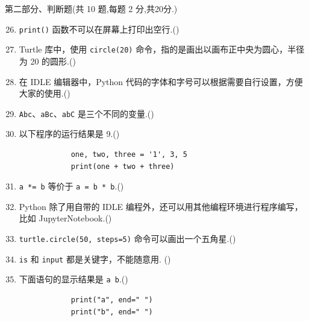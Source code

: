 \documentclass[11pt]{ctexart}
\begin{document}
    {\noindent\heiti 第二部分、判断题(共 10 题,每题 2 分,共20分.)}
    \begin{enumerate}
        \setcounter{enumi}{25}
        \item \lstinline{print()} 函数不可以在屏幕上打印出空行.(\qquad)

        \item Turtle 库中，使用 \lstinline{circle(20)} 命令，指的是画出以画布正中央为圆心，半径为 20 的圆形.(\qquad)
        
        \item 在 IDLE 编辑器中，Python 代码的字体和字号可以根据需要自行设置，方便大家的使用.(\qquad)
  
        \item \lstinline{Abc}、\lstinline{aBc}、\lstinline{abC} 是三个不同的变量.(\qquad)
        
        \item 以下程序的运行结果是 9.(\qquad)
        \begin{lstlisting}
            one, two, three = '1', 3, 5
            print(one + two + three)
        \end{lstlisting}
        
        \item \lstinline{a *= b} 等价于 \lstinline{a = b * b}.(\qquad)
        
        \item Python 除了用自带的 IDLE 编程外，还可以用其他编程环境进行程序编写，比如 JupyterNotebook.(\qquad)
        
        \item \lstinline{turtle.circle(50, steps=5)} 命令可以画出一个五角星.(\qquad)
        
        \item \verb|is| 和 \verb|input| 都是关键字，不能随意用. (\qquad)
        
        \item 下面语句的显示结果是 \lstinline{a b}.(\qquad)
        \begin{lstlisting}
            print("a", end=" ")
            print("b", end=" ")
        \end{lstlisting}
    \end{enumerate}
\end{document}

